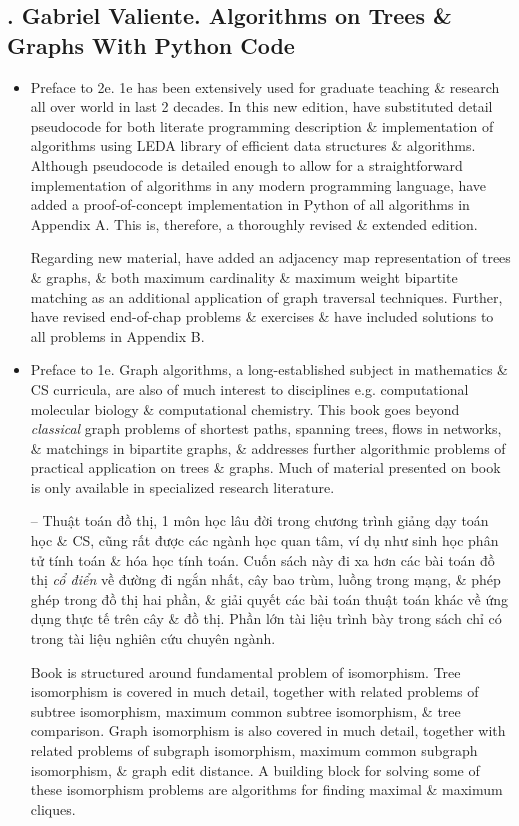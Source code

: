 \documentclass{article}
\begin{document}
\subsection{\cite{Valiente2002, Valiente2021}. {\sc Gabriel Valiente}. Algorithms on Trees \& Graphs With Python Code}

\begin{itemize}
	\item {\sf Preface to 2e.} 1e has been extensively used for graduate teaching \& research all over world in last 2 decades. In this new edition, have substituted detail pseudocode for both literate programming description \& implementation of algorithms using LEDA library of efficient data structures \& algorithms. Although pseudocode is detailed enough to allow for a straightforward implementation of algorithms in any modern programming language, have added a proof-of-concept implementation in Python of all algorithms in Appendix A. This is, therefore, a thoroughly revised \& extended edition.
	
	Regarding new material, have added an adjacency map representation of trees \& graphs, \& both maximum cardinality \& maximum weight bipartite matching as an additional application of graph traversal techniques. Further, have revised end-of-chap problems \& exercises \& have included solutions to all problems in Appendix B.
	\item {\sf Preface to 1e.} Graph algorithms, a long-established subject in mathematics \& CS curricula, are also of much interest to disciplines e.g. computational molecular biology \& computational chemistry. This book goes beyond {\it classical} graph problems of shortest paths, spanning trees, flows in networks, \& matchings in bipartite graphs, \& addresses further algorithmic problems of practical application on trees \& graphs. Much of material presented on book is only available in specialized research literature.
	
	-- Thuật toán đồ thị, 1 môn học lâu đời trong chương trình giảng dạy toán học \& CS, cũng rất được các ngành học quan tâm, ví dụ như sinh học phân tử tính toán \& hóa học tính toán. Cuốn sách này đi xa hơn các bài toán đồ thị {\it cổ điển} về đường đi ngắn nhất, cây bao trùm, luồng trong mạng, \& phép ghép trong đồ thị hai phần, \& giải quyết các bài toán thuật toán khác về ứng dụng thực tế trên cây \& đồ thị. Phần lớn tài liệu trình bày trong sách chỉ có trong tài liệu nghiên cứu chuyên ngành.
	
	Book is structured around fundamental problem of isomorphism. Tree isomorphism is covered in much detail, together with related problems of subtree isomorphism, maximum common subtree isomorphism, \& tree comparison. Graph isomorphism is also covered in much detail, together with related problems of subgraph isomorphism, maximum common subgraph isomorphism, \& graph edit distance. A building block for solving some of these isomorphism problems are algorithms for finding maximal \& maximum cliques.
	

\end{itemize}
\end{document}
